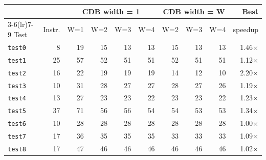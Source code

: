 \begin{tabular}{@{}lr rrrr rrr r@{}}\toprule
& & \multicolumn{4}{c}{CDB width = 1} & \multicolumn{3}{c}{CDB width = W} & Best\\\cmidrule(lr){3-6}\cmidrule(lr){7-9}
Test & Instr. & W=1 & W=2 & W=3 & W=4 & W=2 & W=3 & W=4 & speedup\\\midrule
\texttt{test0} & 8 & 19 & 15 & 13 & 13 & 15 & 13 & 13 & 1.46$\times$\\
\texttt{test1} & 25 & 57 & 52 & 51 & 51 & 52 & 51 & 51 & 1.12$\times$\\
\texttt{test2} & 16 & 22 & 19 & 19 & 19 & 14 & 12 & 10 & 2.20$\times$\\
\texttt{test3} & 10 & 31 & 28 & 27 & 27 & 28 & 27 & 26 & 1.19$\times$\\
\texttt{test4} & 13 & 27 & 23 & 23 & 22 & 23 & 23 & 22 & 1.23$\times$\\
\texttt{test5} & 37 & 71 & 56 & 56 & 54 & 54 & 53 & 53 & 1.34$\times$\\
\texttt{test6} & 10 & 28 & 28 & 28 & 28 & 28 & 28 & 28 & 1.00$\times$\\
\texttt{test7} & 17 & 36 & 35 & 35 & 35 & 33 & 33 & 33 & 1.09$\times$\\
\texttt{test8} & 17 & 47 & 46 & 46 & 46 & 46 & 46 & 46 & 1.02$\times$\\
\bottomrule\end{tabular}
